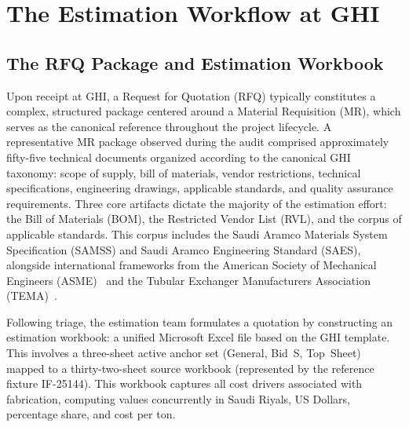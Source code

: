 \section{The Estimation Workflow at GHI}\label{sec:workflow}
\subsection{The RFQ Package and Estimation Workbook}
Upon receipt at GHI, a Request for Quotation (RFQ) typically constitutes a complex, structured package centered around a Material Requisition (MR), which serves as the canonical reference throughout the project lifecycle. A representative MR package observed during the audit comprised approximately fifty-five technical documents organized according to the canonical GHI taxonomy: scope of supply, bill of materials, vendor restrictions, technical specifications, engineering drawings, applicable standards, and quality assurance requirements. Three core artifacts dictate the majority of the estimation effort: the Bill of Materials (BOM), the Restricted Vendor List (RVL), and the corpus of applicable standards. This corpus includes the Saudi Aramco Materials System Specification (SAMSS) and Saudi Aramco Engineering Standard (SAES), alongside international frameworks from the American Society of Mechanical Engineers (ASME)~\cite{asme_bpvc_viii_div1_2025} and the Tubular Exchanger Manufacturers Association (TEMA)~\cite{tema_standards_11ed}.

Following triage, the estimation team formulates a quotation by constructing an estimation workbook: a unified Microsoft Excel file based on the GHI template. This involves a three-sheet active anchor set (General, Bid~S, Top~Sheet) mapped to a thirty-two-sheet source workbook (represented by the reference fixture IF-25144). This workbook captures all cost drivers associated with fabrication, computing values concurrently in Saudi Riyals, US Dollars, percentage share, and cost per ton.

